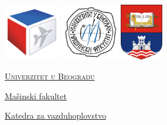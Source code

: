 \documentclass[12pt,oneside]{book}
\begin{document}
\frontmatter
\begin{titlepage}
	\centering
	\vspace*{\fill}
	
    \href{http://vaz.mas.bg.ac.rs/}{\includegraphics[height=2.5cm]{vaz-logo-t}}
    \hspace{0.2cm}
    \href{https://www.mas.bg.ac.rs/}{\includegraphics[height=2.5cm]{mfb-logo-t}}
    \hspace{0.2cm}
    \href{https://www.bg.ac.rs/}{\includegraphics[height=2.5cm]{ub-logo-t}}
    
    \vspace{0.5cm}
    
    {\scshape \LARGE \href{https://www.bg.ac.rs/}{\textcolor{tamno-siva}{Univerzitet u Beogradu}}\par \href{https://www.mas.bg.ac.rs/}{Mašinski fakultet}\par \href{http://vaz.mas.bg.ac.rs/}{\textcolor{tamno-plava}{Katedra za vazduhoplovstvo}}\par} %
    \vspace{0.5cm}

\noindent\hspace{-0.5cm}\makebox[\linewidth]{\textcolor{svetlo-plava}{\rule{\paperwidth}{5pt}}}
	

\end{titlepage}
\end{document}
